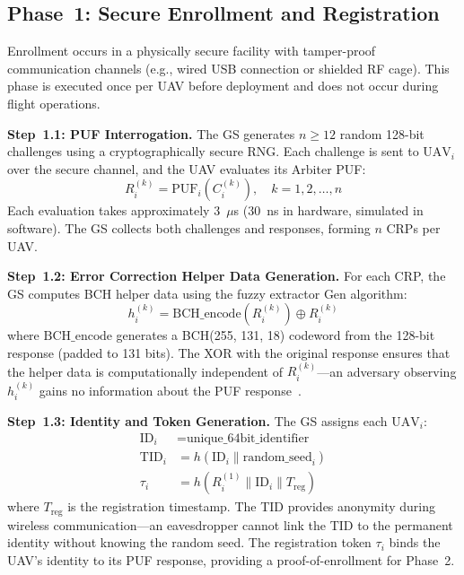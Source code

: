 \documentclass[11pt,a4paper]{article}
\begin{document}
\subsection{Phase~1: Secure Enrollment and Registration}

Enrollment occurs in a physically secure facility with tamper-proof communication channels (e.g., wired USB connection or shielded RF cage). This phase is executed once per UAV before deployment and does not occur during flight operations.

\textbf{Step~1.1: PUF Interrogation.} The GS generates $n \geq 12$ random 128-bit challenges using a cryptographically secure RNG. Each challenge is sent to $\text{UAV}_i$ over the secure channel, and the UAV evaluates its Arbiter PUF:
\begin{equation}
R_i^{(k)} = \text{PUF}_i(C_i^{(k)}), \quad k = 1, 2, \ldots, n
\end{equation}
Each evaluation takes approximately 3~$\mu$s (30~ns in hardware, simulated in software). The GS collects both challenges and responses, forming $n$ CRPs per UAV.

\textbf{Step~1.2: Error Correction Helper Data Generation.} For each CRP, the GS computes BCH helper data using the fuzzy extractor Gen algorithm:
\begin{equation}
h_i^{(k)} = \text{BCH\_encode}(R_i^{(k)}) \oplus R_i^{(k)}
\label{eq:helper_data}
\end{equation}
where $\text{BCH\_encode}$ generates a BCH(255, 131, 18) codeword from the 128-bit response (padded to 131 bits). The XOR with the original response ensures that the helper data is computationally independent of $R_i^{(k)}$---an adversary observing $h_i^{(k)}$ gains no information about the PUF response~\cite{helper_data_masking}.

\textbf{Step~1.3: Identity and Token Generation.} The GS assigns each $\text{UAV}_i$:
\begin{align}
\text{ID}_i &= \text{unique\_64bit\_identifier} \\
\text{TID}_i &= h(\text{ID}_i \| \text{random\_seed}_i) \\
\tau_i &= h(R_i^{(1)} \| \text{ID}_i \| T_{\text{reg}})
\end{align}
where $T_{\text{reg}}$ is the registration timestamp. The TID provides anonymity during wireless communication---an eavesdropper cannot link the TID to the permanent identity without knowing the random seed. The registration token $\tau_i$ binds the UAV's identity to its PUF response, providing a proof-of-enrollment for Phase~2.
\end{document}
